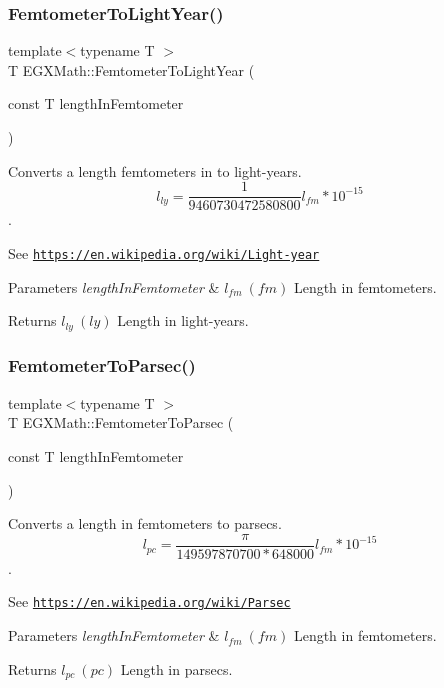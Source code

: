 \subsubsection{\texorpdfstring{Femtometer\+To\+Light\+Year()}{FemtometerToLightYear()}}
{\footnotesize\ttfamily template$<$typename T $>$ \\
T E\+G\+X\+Math\+::\+Femtometer\+To\+Light\+Year (\begin{DoxyParamCaption}\item[{const T}]{length\+In\+Femtometer }\end{DoxyParamCaption})}



Converts a length femtometers in to light-\/years. \[ l_{ly}= \frac{1}{9460730472580800} l_{fm} * 10^{-15} \]. 

See \href{https://en.wikipedia.org/wiki/Light-year}{\tt https\+://en.\+wikipedia.\+org/wiki/\+Light-\/year} 
\begin{DoxyParams}{Parameters}
{\em length\+In\+Femtometer} & $ l_{fm}\ (fm)$ Length in femtometers. \\
\hline
\end{DoxyParams}
\begin{DoxyReturn}{Returns}
$ l_{ly}\ (ly)$ Length in light-\/years. 
\end{DoxyReturn}
\mbox{\label{group___e_g_x_math-_conversions-_length_conversions-_s_i-_femtometer-_astronomical_ga40144bb4cb7d474b9a22394a0f321faa}} 
\subsubsection{\texorpdfstring{Femtometer\+To\+Parsec()}{FemtometerToParsec()}}
{\footnotesize\ttfamily template$<$typename T $>$ \\
T E\+G\+X\+Math\+::\+Femtometer\+To\+Parsec (\begin{DoxyParamCaption}\item[{const T}]{length\+In\+Femtometer }\end{DoxyParamCaption})}



Converts a length in femtometers to parsecs. \[ l_{pc}=\frac{\pi}{149597870700 * 648000} l_{fm} * 10^{-15} \]. 

See \href{https://en.wikipedia.org/wiki/Parsec}{\tt https\+://en.\+wikipedia.\+org/wiki/\+Parsec} 
\begin{DoxyParams}{Parameters}
{\em length\+In\+Femtometer} & $ l_{fm}\ (fm)$ Length in femtometers. \\
\hline
\end{DoxyParams}
\begin{DoxyReturn}{Returns}
$ l_{pc}\ (pc)$ Length in parsecs. 
\end{DoxyReturn}
